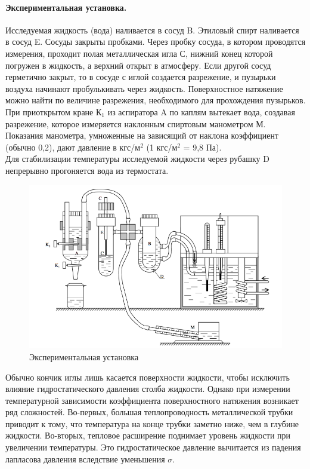 \documentclass{letnab}
\begin{document}
\paragraph{Экспериментальная установка.} Исследуемая жидкость (вода) наливается в сосуд B. Этиловый спирт наливается в сосуд E. Сосуды закрыты пробками. Через пробку сосуда, в котором проводятся измерения, проходит полая металлическая игла С, нижний конец которой погружен в жидкость, а верхний открыт в атмосферу. Если другой сосуд герметично закрыт, то в сосуде с иглой создается разрежение, и пузырьки воздуха начинают пробулькивать через жидкость. Поверхностное натяжение можно найти по величине разрежения, необходимого для прохождения пузырьков.\\
При приоткрытом кране К$_1$ из аспиратора A по каплям вытекает вода, создавая разрежение, которое измеряется наклонным спиртовым манометром М. Показания манометра, умноженные на зависящий от наклона коэффициент (обычно 0,2), дают давление в кгс/м$^2$ (1 кгс/м$^2$ = 9,8 Па).\\
Для стабилизации температуры исследуемой жидкости через рубашку D непрерывно прогоняется вода из термостата.\\
\begin{figure}[H]
	\includegraphics[width = 150mm]{station.png}
	\caption{Экспериментальная установка}
\end{figure}
Обычно кончик иглы лишь касается поверхности жидкости, чтобы исключить влияние гидростатического давления столба жидкости. Однако при измерении температурной зависимости коэффициента поверхностного натяжения возникает ряд сложностей. Во-первых, большая теплопроводность металлической трубки приводит к тому, что температура на конце трубки заметно ниже, чем в глубине жидкости. Во-вторых, тепловое расширение поднимает уровень жидкости при увеличении температуры. Это гидростатическое давление вычитается из падения лапласова давления вследствие уменьшения $\sigma$.\\
\end{document}
